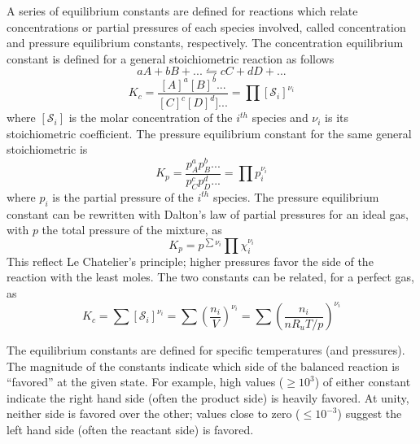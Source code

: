 \documentclass[11pt]{article}
\newcommand{\CenteredBoxed}[1]{\begin{center}\boxed{#1}\end{center}}
\begin{document}
A series of equilibrium constants are defined for reactions which relate concentrations or partial pressures of each species involved, called concentration and pressure equilibrium constants, respectively. The concentration equilibrium constant is defined for a general stoichiometric reaction as follows
$$aA+bB+...\leftrightharpoons cC + dD +...$$
$$K_c = \frac{[A]^a[B]^b...}{[C]^c[D]^d]...}=\prod[\mathcal{S}_i]^{\nu_i}$$
where $[\mathcal{S}_i]$ is the molar concentration of the $i^{th}$ species and $\nu_i$ is its stoichiometric coefficient. The pressure equilibrium constant for the same general stoichiometric  is
$$K_p=\frac{p_A^ap_B^b...}{p_C^cp_D^d...}=\prod p_i^{\nu_i}$$
where $p_i$ is the partial pressure of the $i^{th}$ species. The pressure equilibrium constant can be rewritten with Dalton's law of partial pressures for an ideal gas, with $p$ the total pressure of the mixture, as
$$K_p=p^{\sum\nu_i}\prod\chi_i^{\nu_i}$$
This reflect Le Chatelier's principle; higher pressures favor the side of the reaction with the least moles. The two constants can be related, for a perfect gas, as
$$K_c = \sum[\mathcal{S}_i]^{\nu_i}=\sum\left(\frac{n_i}{V}\right)^{\nu_i}=\sum\left(\frac{n_i}{nR_uT/p}\right)^{\nu_i}$$
\CenteredBoxed{K_c = \left(\frac{1}{R_uT}\right)^{\sum\nu_i}\sum\left(p\chi_i\right)^{\nu_i}=\frac{1}{R_uT}K_p}

The equilibrium constants are defined for specific temperatures (and pressures). The magnitude of the constants indicate which side of the balanced reaction is ``favored'' at the given state. For example, high values ($\geq10^3$) of either constant indicate the right hand side (often the product side) is heavily favored. At unity, neither side is favored over the other; values close to zero ($\leq10^{-3}$) suggest the left hand side (often the reactant side) is favored.\\
\end{document}
